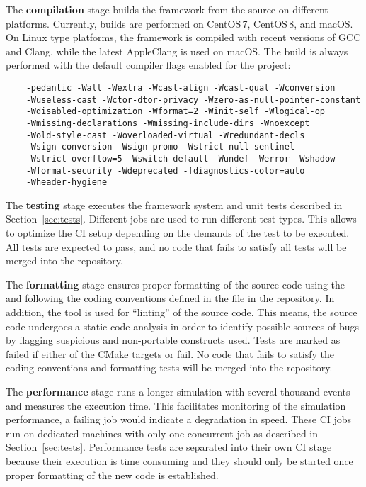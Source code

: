 The \textbf{compilation} stage builds the framework from the source on different platforms.
Currently, builds are performed on CentOS\,7, CentOS\,8, and macOS.
On Linux type platforms, the framework is compiled with recent versions of GCC and Clang, while the latest AppleClang is used on macOS.
The build is always performed with the default compiler flags enabled for the project:
\begin{verbatim}
    -pedantic -Wall -Wextra -Wcast-align -Wcast-qual -Wconversion
    -Wuseless-cast -Wctor-dtor-privacy -Wzero-as-null-pointer-constant
    -Wdisabled-optimization -Wformat=2 -Winit-self -Wlogical-op
    -Wmissing-declarations -Wmissing-include-dirs -Wnoexcept
    -Wold-style-cast -Woverloaded-virtual -Wredundant-decls
    -Wsign-conversion -Wsign-promo -Wstrict-null-sentinel
    -Wstrict-overflow=5 -Wswitch-default -Wundef -Werror -Wshadow
    -Wformat-security -Wdeprecated -fdiagnostics-color=auto
    -Wheader-hygiene
\end{verbatim}

The \textbf{testing} stage executes the framework system and unit tests described in Section~\ref{sec:tests}.
Different jobs are used to run different test types.
This allows to optimize the CI setup depending on the demands of the test to be executed.
All tests are expected to pass, and no code that fails to satisfy all tests will be merged into the repository.

The \textbf{formatting} stage ensures proper formatting of the source code using the  and following the coding conventions defined in the  file in the repository.
In addition, the  tool is used for ``linting'' of the source code.
This means, the source code undergoes a static code analysis in order to identify possible sources of bugs by flagging suspicious and non-portable constructs used.
Tests are marked as failed if either of the CMake targets  or  fail.
No code that fails to satisfy the coding conventions and formatting tests will be merged into the repository.

The \textbf{performance} stage runs a longer simulation with several thousand events and measures the execution time.
This facilitates monitoring of the simulation performance, a failing job would indicate a degradation in speed.
These CI jobs run on dedicated machines with only one concurrent job as described in Section~\ref{sec:tests}.
Performance tests are separated into their own CI stage because their execution is time consuming and they should only be started once proper  formatting of the new code is established.

